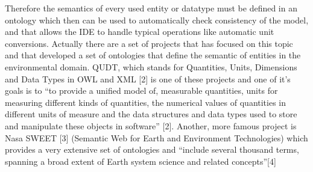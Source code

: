 Therefore the semantics of every used entity or datatype must be defined in an ontology which then can be used to automatically check consistency of the model, and that allows the IDE to handle typical operations like automatic unit conversions. Actually there are a set of projects that has focused on this topic  and that developed a set of ontologies that define the semantic of entities in the environmental domain.  QUDT, which stands for Quantities, Units, Dimensions and Data Types in OWL and XML [2] is one of these projects and one of it’s goals is to “to provide a unified model of, measurable quantities, units for measuring different kinds of quantities, the numerical values of quantities in different units of measure and the data structures and data types used to store and manipulate these objects in software” [2]. Another, more famous project is Nasa SWEET [3] (Semantic Web for Earth and Environment Technologies) which provides a very extensive set of ontologies and “include several thousand terms, spanning a broad extent of Earth system science and related concepts”[4]

